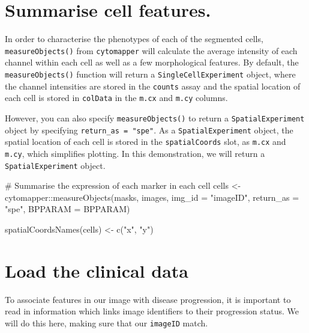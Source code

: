 \documentclass[
  letterpaper,
  DIV=11,
  numbers=noendperiod]{scrreprt}
\newenvironment{Shaded}{\begin{snugshade}}{\end{snugshade}}
\newcommand{\AttributeTok}[1]{\textcolor[rgb]{0.40,0.45,0.13}{#1}}
\newcommand{\CommentTok}[1]{\textcolor[rgb]{0.37,0.37,0.37}{#1}}
\newcommand{\FunctionTok}[1]{\textcolor[rgb]{0.28,0.35,0.67}{#1}}
\newcommand{\NormalTok}[1]{\textcolor[rgb]{0.00,0.23,0.31}{#1}}
\newcommand{\OtherTok}[1]{\textcolor[rgb]{0.00,0.23,0.31}{#1}}
\newcommand{\SpecialCharTok}[1]{\textcolor[rgb]{0.37,0.37,0.37}{#1}}
\newcommand{\StringTok}[1]{\textcolor[rgb]{0.13,0.47,0.30}{#1}}
\begin{document}
\section{Summarise cell features.}\label{summarise-cell-features.}

In order to characterise the phenotypes of each of the segmented cells,
\texttt{measureObjects()} from \texttt{cytomapper} will calculate the
average intensity of each channel within each cell as well as a few
morphological features. By default, the \texttt{measureObjects()}
function will return a \texttt{SingleCellExperiment} object, where the
channel intensities are stored in the \texttt{counts} assay and the
spatial location of each cell is stored in \texttt{colData} in the
\texttt{m.cx} and \texttt{m.cy} columns.

However, you can also specify \texttt{measureObjects()} to return a
\texttt{SpatialExperiment} object by specifying
\texttt{return\_as\ =\ "spe"}. As a \texttt{SpatialExperiment} object,
the spatial location of each cell is stored in the
\texttt{spatialCoords} slot, as \texttt{m.cx} and \texttt{m.cy}, which
simplifies plotting. In this demonstration, we will return a
\texttt{SpatialExperiment} object.

\begin{Shaded}
\begin{Highlighting}[]
\CommentTok{\# Summarise the expression of each marker in each cell}
\NormalTok{cells }\OtherTok{\textless{}{-}}\NormalTok{ cytomapper}\SpecialCharTok{::}\FunctionTok{measureObjects}\NormalTok{(masks,}
\NormalTok{                                    images,}
                                    \AttributeTok{img\_id =} \StringTok{"imageID"}\NormalTok{,}
                                    \AttributeTok{return\_as =} \StringTok{"spe"}\NormalTok{,}
                                    \AttributeTok{BPPARAM =}\NormalTok{ BPPARAM)}

\FunctionTok{spatialCoordsNames}\NormalTok{(cells) }\OtherTok{\textless{}{-}} \FunctionTok{c}\NormalTok{(}\StringTok{"x"}\NormalTok{, }\StringTok{"y"}\NormalTok{)}
\end{Highlighting}
\end{Shaded}

\section{Load the clinical data}\label{load-the-clinical-data}

To associate features in our image with disease progression, it is
important to read in information which links image identifiers to their
progression status. We will do this here, making sure that our
\texttt{imageID} match.
\end{document}
